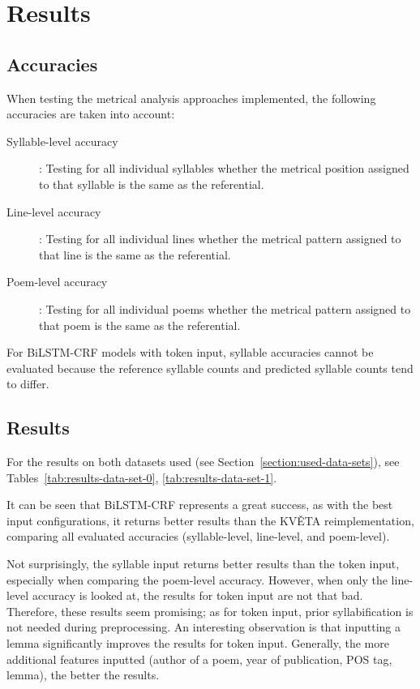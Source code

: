 \chapter{Results}\label{chap:results}

\section{Accuracies}
When testing the metrical analysis approaches implemented, the following accuracies are taken into account:
\begin{description}
    \item[Syllable-level accuracy]: Testing for all individual syllables whether the metrical position assigned to that syllable is the same as the referential.
    \item[Line-level accuracy]: Testing for all individual lines whether the metrical pattern assigned to that line is the same as the referential.
    \item[Poem-level accuracy]: Testing for all individual poems whether the metrical pattern assigned to that poem is the same as the referential.
\end{description}

For BiLSTM-CRF models with token input, syllable accuracies cannot be evaluated because the reference syllable counts and predicted syllable counts tend to differ.

\section{Results}
For the results on both datasets used (see Section~\ref{section:used-data-sets}), see Tables~\ref{tab:results-data-set-0}, \ref{tab:results-data-set-1}.

It can be seen that BiLSTM-CRF represents a great success, as with the best input configurations, it returns better results than the KVĚTA reimplementation, comparing all evaluated accuracies (syllable-level, line-level, and poem-level).

Not surprisingly, the syllable input returns better results than the token input, especially when comparing the poem-level accuracy. However, when only the line-level accuracy is looked at, the results for token input are not that bad. Therefore, these results seem promising; as for token input, prior syllabification is not needed during preprocessing. An interesting observation is that inputting a lemma significantly improves the results for token input. Generally, the more additional features inputted (author of a poem, year of publication, POS tag, lemma), the better the results.

